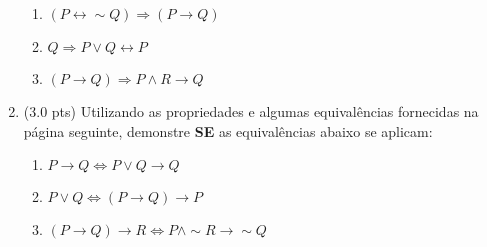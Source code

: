 \documentclass[12pt]{article}
\begin{document}
\begin{enumerate}
\begin{enumerate}
\setlength{\itemsep}{-2pt}




\item $(P \leftrightarrow \sim Q) \Rightarrow (P \rightarrow Q)$

\item $Q \Rightarrow P \vee Q \leftrightarrow P$


\item $(P \rightarrow Q) \Rightarrow P \wedge R \rightarrow Q $

\end{enumerate}


\item (3.0 pts) Utilizando as propriedades e algumas equivalências
fornecidas na página seguinte, demonstre {\bf SE} as equivalências abaixo 
se aplicam:

\begin{enumerate}
\setlength{\itemsep}{-2pt}

\item $P \rightarrow Q \Leftrightarrow P \vee Q \rightarrow  Q$ %






\item $P \vee Q \Leftrightarrow (P \rightarrow Q) \rightarrow P$ %

\item $(P \rightarrow Q) \rightarrow R \Leftrightarrow P \wedge \sim R \rightarrow \sim Q$ %


\end{enumerate}






\end{enumerate}
\newpage
\end{document}
